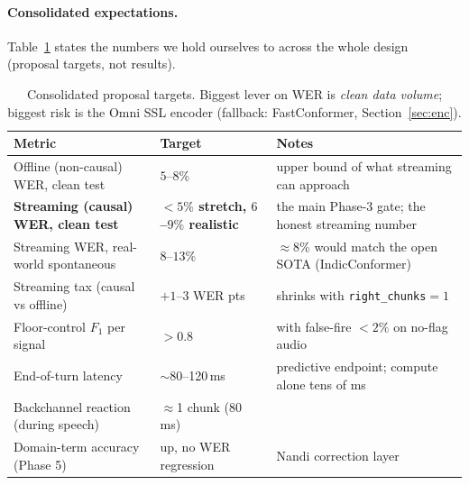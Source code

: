 \documentclass[11pt]{article}
\newcommand{\code}[1]{\texttt{#1}}
\begin{document}
\paragraph{Consolidated expectations.} Table~\ref{tab:expect} states the numbers we hold
ourselves to across the whole design (proposal targets, not results).
\begin{table}[h]\centering\small
\begin{tabular}{@{}p{5.4cm} p{3.2cm} p{4.4cm}@{}}
\toprule
Metric & Target & Notes\\
\midrule
Offline (non-causal) WER, clean test & $5$--$8\%$ & upper bound of what streaming can approach\\
\textbf{Streaming (causal) WER, clean test} & \textbf{$<5\%$ stretch, $6$--$9\%$ realistic} & the main Phase-3 gate; the honest streaming number\\
Streaming WER, real-world spontaneous & $8$--$13\%$ & $\approx$8\% would match the open SOTA (IndicConformer)\\
Streaming tax (causal vs offline) & $+1$--$3$ WER pts & shrinks with \code{right\_chunks}$=1$\\
Floor-control $F_1$ per signal & $>0.8$ & with false-fire $<2\%$ on no-flag audio\\
End-of-turn latency & $\sim$80--120\,ms & predictive endpoint; compute alone tens of ms\\
Backchannel reaction (during speech) & $\approx$1 chunk ($80$\,ms) & \\
Domain-term accuracy (Phase 5) & up, no WER regression & Nandi correction layer\\
\bottomrule
\end{tabular}
\caption{Consolidated proposal targets. Biggest lever on WER is \emph{clean data volume};
biggest risk is the Omni SSL encoder (fallback: FastConformer, Section~\ref{sec:enc}).}
\label{tab:expect}
\end{table}
\end{document}
